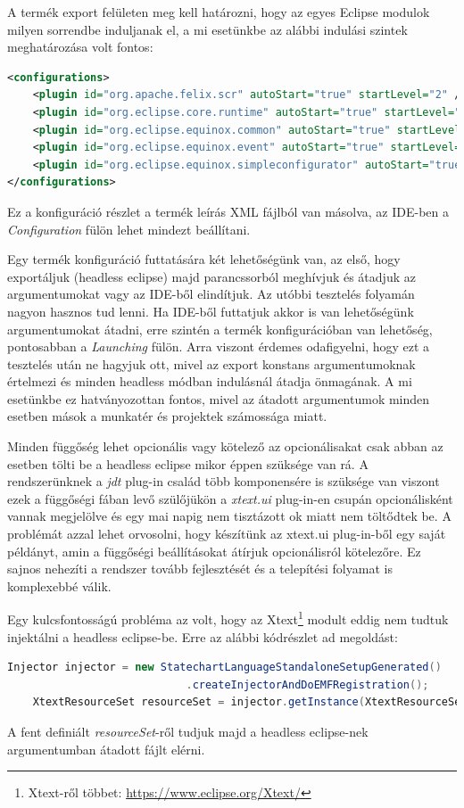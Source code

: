 A termék export felületen meg kell határozni, hogy az egyes Eclipse modulok milyen sorrendbe induljanak el, a mi esetünkbe az alábbi indulási szintek meghatározása volt fontos:
\begin{lstlisting}[language=XML]
<configurations>
	<plugin id="org.apache.felix.scr" autoStart="true" startLevel="2" />
	<plugin id="org.eclipse.core.runtime" autoStart="true" startLevel="0" />
	<plugin id="org.eclipse.equinox.common" autoStart="true" startLevel="2" />
	<plugin id="org.eclipse.equinox.event" autoStart="true" startLevel="2" />
	<plugin id="org.eclipse.equinox.simpleconfigurator" autoStart="true" startLevel="1" />
</configurations>
\end{lstlisting}
Ez a konfiguráció részlet a termék leírás XML fájlból van másolva, az IDE-ben a \textit{Configuration} fülön lehet mindezt beállítani.

Egy termék konfiguráció futtatására két lehetőségünk van, az első, hogy exportáljuk (headless eclipse) majd parancssorból meghívjuk és átadjuk az argumentumokat vagy az IDE-ből elindítjuk. Az utóbbi tesztelés folyamán nagyon hasznos tud lenni. Ha IDE-ből futtatjuk akkor is van lehetőségünk argumentumokat átadni, erre szintén a termék konfigurációban van lehetőség, pontosabban a \textit{Launching} fülön. Arra viszont érdemes odafigyelni, hogy ezt a tesztelés után ne hagyjuk ott, mivel az export konstans argumentumoknak értelmezi és minden headless módban indulásnál átadja önmagának. A mi esetünkbe ez hatványozottan fontos, mivel az átadott argumentumok minden esetben mások a munkatér és projektek számossága miatt.

Minden függőség lehet opcionális vagy kötelező az opcionálisakat csak abban az esetben tölti be a headless eclipse mikor éppen szüksége van rá. A rendszerünknek a \textit{jdt} plug-in család több komponensére is szüksége van viszont ezek a függőségi fában levő szülőjükön a \textit{xtext.ui} plug-in-en csupán opcionálisként vannak megjelölve és egy mai napig nem tisztázott ok miatt nem töltődtek be. A problémát azzal lehet orvosolni, hogy készítünk az xtext.ui plug-in-ből egy saját példányt, amin a függőségi beállításokat átírjuk opcionálisról kötelezőre. Ez sajnos nehezíti a rendszer tovább fejlesztését és a telepítési folyamat is komplexebbé válik.

Egy kulcsfontosságú probléma az volt, hogy az Xtext\footnote{Xtext-ről többet: \url{https://www.eclipse.org/Xtext/}} modult eddig nem tudtuk injektálni a headless eclipse-be. Erre az alábbi kódrészlet ad megoldást:
\begin{lstlisting}[language=Java]
 	Injector injector = new StatechartLanguageStandaloneSetupGenerated()
 							.createInjectorAndDoEMFRegistration();
 	XtextResourceSet resourceSet = injector.getInstance(XtextResourceSet.class);
\end{lstlisting}
A fent definiált \textit{resourceSet}-ről tudjuk majd a headless eclipse-nek argumentumban átadott fájlt elérni.

